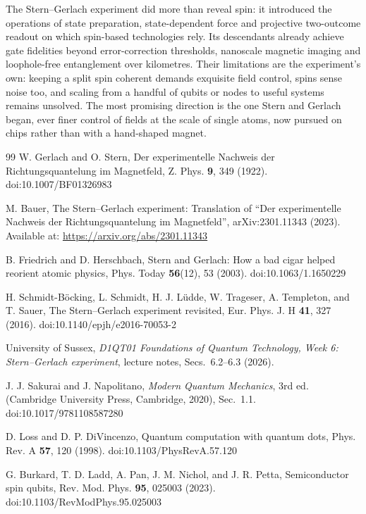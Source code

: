 The Stern--Gerlach experiment did more than reveal spin: it introduced the operations of state preparation, state-dependent force and projective two-outcome readout on which spin-based technologies rely. Its descendants already achieve gate fidelities beyond error-correction thresholds, nanoscale magnetic imaging and loophole-free entanglement over kilometres. Their limitations are the experiment's own: keeping a split spin coherent demands exquisite field control, spins sense noise too, and scaling from a handful of qubits or nodes to useful systems remains unsolved. The most promising direction is the one Stern and Gerlach began, ever finer control of fields at the scale of single atoms, now pursued on chips rather than with a hand-shaped magnet.

\begin{thebibliography}{99}
\small
{} W. Gerlach and O. Stern, Der experimentelle Nachweis der Richtungsquantelung im Magnetfeld, Z. Phys. \textbf{9}, 349 (1922). doi:10.1007/BF01326983

 M. Bauer, The Stern--Gerlach experiment: Translation of ``Der experimentelle Nachweis der Richtungsquantelung im Magnetfeld'', arXiv:2301.11343 (2023). Available at: \url{https://arxiv.org/abs/2301.11343}

 B. Friedrich and D. Herschbach, Stern and Gerlach: How a bad cigar helped reorient atomic physics, Phys. Today \textbf{56}(12), 53 (2003). doi:10.1063/1.1650229

 H. Schmidt-B\"ocking, L. Schmidt, H. J. L\"udde, W. Trageser, A. Templeton, and T. Sauer, The Stern--Gerlach experiment revisited, Eur. Phys. J. H \textbf{41}, 327 (2016). doi:10.1140/epjh/e2016-70053-2

 University of Sussex, \emph{D1QT01 Foundations of Quantum Technology, Week 6: Stern--Gerlach experiment}, lecture notes, Secs.~6.2--6.3 (2026).

 J. J. Sakurai and J. Napolitano, \emph{Modern Quantum Mechanics}, 3rd ed. (Cambridge University Press, Cambridge, 2020), Sec.~1.1. doi:10.1017/9781108587280

 D. Loss and D. P. DiVincenzo, Quantum computation with quantum dots, Phys. Rev. A \textbf{57}, 120 (1998). doi:10.1103/PhysRevA.57.120

 G. Burkard, T. D. Ladd, A. Pan, J. M. Nichol, and J. R. Petta, Semiconductor spin qubits, Rev. Mod. Phys. \textbf{95}, 025003 (2023). doi:10.1103/RevModPhys.95.025003


\end{thebibliography}
